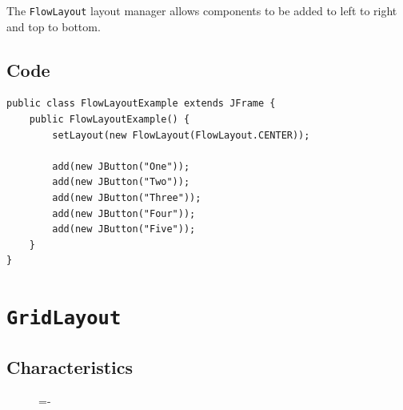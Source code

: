 \documentclass[a4paper]{systems-software}
\begin{document}
The \texttt{FlowLayout} layout manager allows components to be added to left to right and top to bottom.


\subsection*{Code}

\begin{lstlisting}[title={A FlowLayout class.}]
public class FlowLayoutExample extends JFrame {
	public FlowLayoutExample() {
		setLayout(new FlowLayout(FlowLayout.CENTER));
		
		add(new JButton("One"));
		add(new JButton("Two"));
		add(new JButton("Three"));
		add(new JButton("Four"));
		add(new JButton("Five"));
	}
}
\end{lstlisting}


\section*{\texttt{GridLayout}}

\subsection*{Characteristics}

\begin{figure}[H]
	\lineskip=-\fboxrule
\end{figure}
\end{document}
